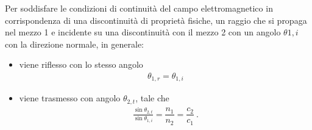 \documentclass[letterpaper,10pt,italian]{jupyterBook}
\begin{document}
\sphinxAtStartPar
{} Per soddisfare le condizioni di continuità del campo elettromagnetico in corrispondenza di una discontinuità di proprietà fisiche, un raggio che si propaga nel mezzo 1 e incidente su una discontinuità con il mezzo 2 con un angolo \(\theta{1,i}\) con la direzione normale, in generale:
\begin{itemize}
\item {} 
\sphinxAtStartPar
viene riflesso con lo stesso angolo
\begin{equation*}
\begin{split}\theta_{1,r} = \theta_{1,i}\end{split}
\end{equation*}
\item {} 
\sphinxAtStartPar
viene trasmesso con angolo \(\theta_{2,t}\), tale che
\begin{equation*}
\begin{split}\frac{\sin \theta_{2,t}}{\sin \theta_{1,i}} = \dfrac{n_1}{n_2} = \dfrac{c_2}{c_1} \ .\end{split}
\end{equation*}
\end{itemize}

\sphinxAtStartPar
{} 
\end{document}
